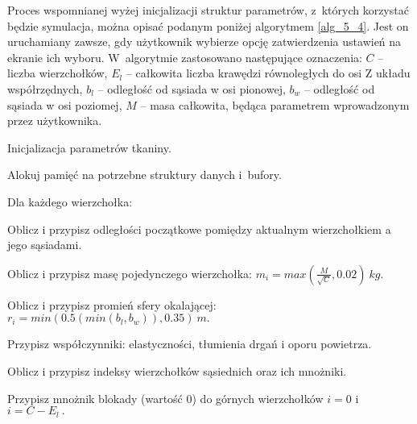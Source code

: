 			Proces wspomnianej wyżej inicjalizacji struktur parametrów, z~których korzystać będzie symulacja, można opisać podanym poniżej algorytmem \ref{alg_5_4}. Jest on uruchamiany zawsze, gdy użytkownik wybierze opcję zatwierdzenia ustawień na ekranie ich wyboru. W~algorytmie zastosowano następujące oznaczenia: \(C\) -- liczba wierzchołków, \(E_{l}\) -- całkowita liczba krawędzi równoległych do osi Z układu współrzędnych, \(b_{l}\) -- odległość od sąsiada w osi pionowej, \(b_{w}\) -- odległość od sąsiada w osi poziomej, \(M\) -- masa całkowita, będąca parametrem wprowadzonym przez użytkownika.
			
			\begin{algorithm}
				\label{alg_5_4}
				\caption{Inicjalizacja parametrów tkaniny.}	
				
				Alokuj pamięć na potrzebne struktury danych i~bufory.
				
				Dla każdego wierzchołka:
				
				\Indp
				
				Oblicz i przypisz odległości początkowe pomiędzy aktualnym wierzchołkiem a jego sąsiadami.
				
				
				
				
				
				
				
				Oblicz i przypisz masę pojedynczego wierzchołka: \( m_{i} = max(\frac{M}{\sqrt{C}}, 0.02) \  kg. \)
				
				Oblicz i przypisz promień sfery okalającej: \( r_{i} = min( 0.5(min(b_{l}, b_{w})), 0.35 ) \ m. \)
				
				Przypisz współczynniki: elastyczności, tłumienia drgań i oporu powietrza.
				
				Oblicz i przypisz indeksy wierzchołków sąsiednich oraz ich mnożniki.
				
				\Indm
				
				Przypisz mnożnik blokady (wartość \(0\)) do górnych wierzchołków \(i = 0\) i \(i = C - E_{l} \ .\)
				
			\end{algorithm}
		\newpage
